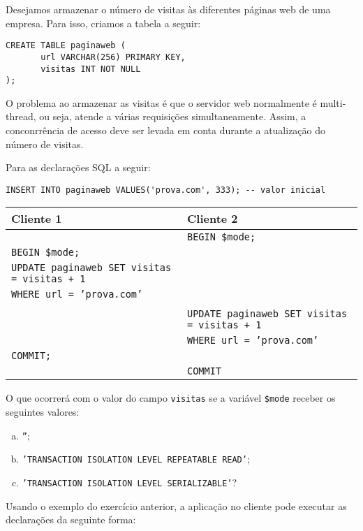  Desejamos armazenar o número de visitas às diferentes
páginas web de uma empresa. Para isso, criamos a tabela a seguir:

\begin{verbatim}
CREATE TABLE paginaweb (
       url VARCHAR(256) PRIMARY KEY,
       visitas INT NOT NULL
);
\end{verbatim}

O problema ao armazenar as visitas é que o servidor web normalmente é
multi-thread, ou seja, atende a várias requisições simultaneamente. Assim,
a conconrrência de acesso deve ser levada em conta durante a atualização
do número de visitas.

Para as declarações SQL a seguir:

\begin{verbatim}
INSERT INTO paginaweb VALUES('prova.com', 333); -- valor inicial
\end{verbatim}

\begin{center}
\begin{tabular}{l|l}\hline
\bf \hfil Cliente 1 &\bf Cliente 2 \\\hline
 & \tt BEGIN \$mode;\\
 \tt BEGIN \$mode; & \\
\tt UPDATE paginaweb SET visitas = visitas + 1 &\\
\tt WHERE url = 'prova.com' & \\
 & \\
 & \tt UPDATE paginaweb SET visitas = visitas + 1 \\
 & \tt WHERE url = 'prova.com'  \\
\tt COMMIT; &\\
 &\tt COMMIT \\\hline
\end{tabular}
\end{center}

O que ocorrerá com o valor do campo {\tt visitas} se a variável
{\tt \$mode} receber os seguintes valores:

\begin{enumerate}[a)]
\item {\tt ''};
\item {\tt 'TRANSACTION ISOLATION LEVEL REPEATABLE READ'};
\item {\tt 'TRANSACTION ISOLATION LEVEL SERIALIZABLE'}?
\end{enumerate}

 Usando o exemplo do exercício anterior, a aplicação
no cliente pode executar as declarações da seguinte forma: 

